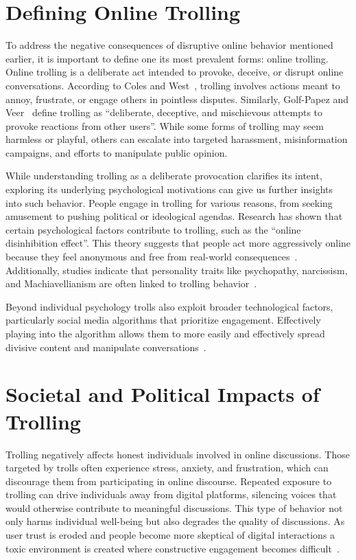\documentclass[twoside]{ctuthesis}
\theoremstyle{plain}
\theoremstyle{definition}
\theoremstyle{note}
\begin{document}
\section{Defining Online Trolling}
To address the negative consequences of disruptive online behavior mentioned earlier, it is important to define one its most prevalent forms: online trolling. Online trolling is a deliberate act intended to provoke, deceive, or disrupt online conversations. According to Coles and West~\cite{Coles2016}, trolling involves actions meant to annoy, frustrate, or engage others in pointless disputes. Similarly, Golf-Papez and Veer~\cite{GolfPapez2017DontFeedTheTroll} define trolling as ``deliberate, deceptive, and mischievous attempts to provoke reactions from other users''. While some forms of trolling may seem harmless or playful, others can escalate into targeted harassment, misinformation campaigns, and efforts to manipulate public opinion.\par

While understanding trolling as a deliberate provocation clarifies its intent, exploring its underlying psychological motivations can give us further insights into such behavior. People engage in trolling for various reasons, from seeking amusement to pushing political or ideological agendas. Research has shown that certain psychological factors contribute to trolling, such as the ``online disinhibition effect''. This theory suggests that people act more aggressively online because they feel anonymous and free from real-world consequences~\cite{Suler2004}. Additionally, studies indicate that personality traits like psychopathy, narcissism, and Machiavellianism are often linked to trolling behavior~\cite{Buckels2014TrollsWantToHaveFun}.\par

Beyond individual psychology trolls also exploit broader technological factors, particularly social media algorithms that prioritize engagement. Effectively playing into the algorithm allows them to more easily and effectively spread divisive content and manipulate conversations~\cite{GolfPapez2017DontFeedTheTroll}.

\section{Societal and Political Impacts of Trolling}
Trolling negatively affects honest individuals involved in online discussions. Those targeted by trolls often experience stress, anxiety, and frustration, which can discourage them from participating in online discourse. Repeated exposure to trolling can drive individuals away from digital platforms, silencing voices that would otherwise contribute to meaningful discussions. This type of behavior not only harms individual well-being but also degrades the quality of discussions. As user trust is eroded and people become more skeptical of digital interactions a toxic environment is created where constructive engagement becomes difficult~\cite{GolfPapez2017DontFeedTheTroll}.\par
\end{document}
